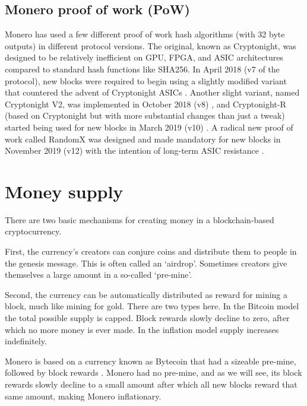 \subsection*{Monero proof of work (PoW)}

Monero has used a few different proof of work hash algorithms (with 32 byte outputs) in different protocol versions. The original, known as Cryptonight, was designed to be relatively inefficient on GPU, FPGA, and ASIC architectures \cite{CryptoNight} compared to standard hash functions like SHA256. In April 2018 (v7 of the protocol), new blocks were required to begin using a slightly modified variant that countered the advent of Cryptonight ASICs \cite{cryptonight7}. Another slight variant, named Cryptonight V2, was implemented in October 2018 (v8) \cite{berylliumbullet-v8}, and Cryptonight-R (based on Cryptonight but with more substantial changes than just a tweak) started being used for new blocks in March 2019 (v10) \cite{boronbutterfly-v10}. A radical new proof of work called RandomX \cite{randomx-pr-5549} was designed and made mandatory for new blocks in November 2019 (v12) with the intention of long-term ASIC resistance \cite{randomx}.



\section{Money supply}
\label{sec:money-supply}

There are two basic mechanisms for creating money in a blockchain-based cryptocurrency.

First, the currency's creators can conjure coins and distribute them to people in the genesis message. This is often called an `airdrop'. Sometimes creators give themselves a large amount in a so-called `pre-mine'. \cite{premine-description}

Second, the currency can be automatically distributed as reward for mining a block, much like mining for gold. There are two types here. In the Bitcoin model the total possible supply is capped. Block rewards slowly decline to zero, after which no more money is ever made. In the inflation model supply increases indefinitely.

Monero is based on a currency known as Bytecoin that had a sizeable pre-mine, followed by block rewards \cite{monero-history}. Monero had no pre-mine, and as we will see, its block rewards slowly decline to a small amount after which all new blocks reward that same amount, making Monero inflationary.


